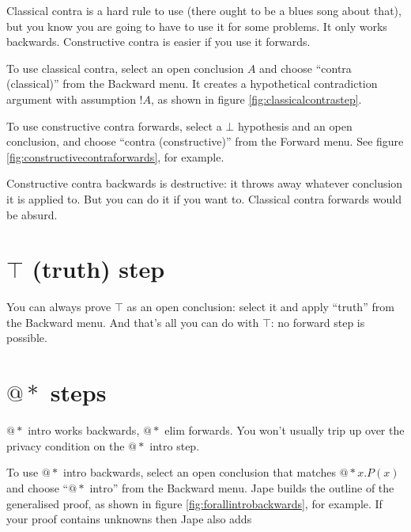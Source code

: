 \documentclass[11pt]{book}
\newcommand{\figref}[1]{figure \ref{fig:#1}}
\begin{document}
Classical contra is a hard rule to use (there ought to be a blues song about that), but you know you are going to have to use it for some problems. It only works backwards. Constructive contra is easier if you use it forwards.

To use classical contra, select an open conclusion $A$ and choose ``contra (classical)'' from the Backward menu. It creates a hypothetical contradiction argument with assumption $!A$, as shown in \figref{classicalcontrastep}.

To use constructive contra forwards, select a $\bot$ hypothesis and an open conclusion, and choose ``contra (constructive)'' from the Forward menu. See \figref{constructivecontraforwards}, for example.

Constructive contra backwards is destructive: it throws away whatever conclusion it is applied to. But you can do it if you want to. Classical contra forwards would be absurd.

\section{$\top$ (truth) step}

You can always prove $\top$ as an open conclusion: select it and apply ``truth'' from the Backward menu. And that's all you can do with $\top$: no forward step is possible.

\section{$@*$ steps}

$@*$ intro works backwards, $@*$ elim forwards. You won't usually trip up over the privacy condition on the $@*$ intro step.

To use $@*$ intro backwards, select an open conclusion that matches $@*x.P(x)$ and choose ``$@*$ intro'' from the Backward menu. Jape builds the outline of the generalised proof, as shown in \figref{forallintrobackwards}, for example. If your proof contains unknowns then Jape also adds 


%

\end{document}
